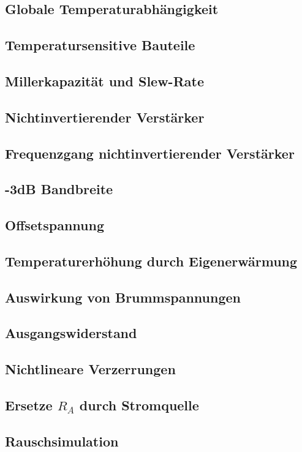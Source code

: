     

\subsection{Globale Temperaturabhängigkeit}

\subsection{Temperatursensitive Bauteile}

\subsection{Millerkapazität und Slew-Rate}

\subsection{Nichtinvertierender Verstärker}

\subsection{Frequenzgang nichtinvertierender Verstärker}

\subsection{-3dB Bandbreite}

\subsection{Offsetspannung}

\subsection{Temperaturerhöhung durch Eigenerwärmung}

\subsection{Auswirkung von Brummspannungen}

\subsection{Ausgangswiderstand}

\subsection{Nichtlineare Verzerrungen}

\subsection{Ersetze $R_A$ durch Stromquelle}

\subsection{Rauschsimulation}



